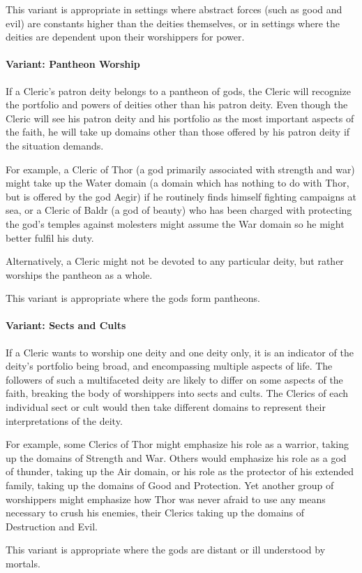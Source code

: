 This variant is appropriate in settings where abstract forces (such as good and evil) are constants higher than the deities themselves, or in settings where the deities are dependent upon their worshippers for power.
\paragraph{Variant: Pantheon Worship}
If a Cleric's patron deity belongs to a pantheon of gods, the Cleric will recognize the portfolio and powers of deities other than his patron deity.
Even though the Cleric will see his patron deity and his portfolio as the most important aspects of the faith, he will take up domains other than those offered by his patron deity if the situation demands.

For example, a Cleric of Thor (a god primarily associated with strength and war) might take up the Water domain (a domain which has nothing to do with Thor, but is offered by the god Aegir) if he routinely finds himself fighting campaigns at sea, or a Cleric of Baldr (a god of beauty) who has been charged with protecting the god's temples against molesters might assume the War domain so he might better fulfil his duty.

Alternatively, a Cleric might not be devoted to any particular deity, but rather worships the pantheon as a whole.

This variant is appropriate where the gods form pantheons.
\paragraph{Variant: Sects and Cults}
If a Cleric wants to worship one deity and one deity only, it is an indicator of the deity's portfolio being broad, and encompassing multiple aspects of life. 
The followers of such a multifaceted deity are likely to differ on some aspects of the faith, breaking the body of worshippers into sects and cults. 
The Clerics of each individual sect or cult would then take different domains to represent their interpretations of the deity.

For example, some Clerics of Thor might emphasize his role as a warrior, taking up the domains of Strength and War.
Others would emphasize his role as a god of thunder, taking up the Air domain, or his role as the protector of his extended family, taking up the domains of Good and Protection. 
Yet another group of worshippers might emphasize how Thor was never afraid to use any means necessary to crush his enemies,
their Clerics taking up the domains of Destruction and Evil.

This variant is appropriate where the gods are distant or ill understood by mortals.
